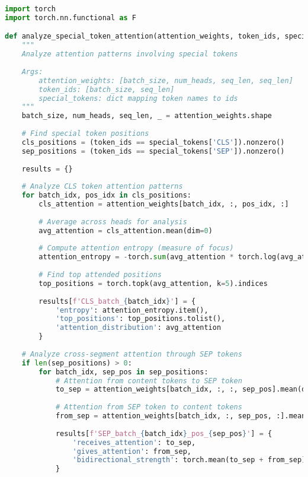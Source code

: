 \begin{lstlisting}[language=Python, caption=Attention pattern analysis with special tokens]
import torch
import torch.nn.functional as F

def analyze_special_token_attention(attention_weights, token_ids, special_tokens):
    """
    Analyze attention patterns involving special tokens
    
    Args:
        attention_weights: [batch_size, num_heads, seq_len, seq_len]
        token_ids: [batch_size, seq_len] 
        special_tokens: dict mapping token names to ids
    """
    batch_size, num_heads, seq_len, _ = attention_weights.shape
    
    # Find special token positions
    cls_positions = (token_ids == special_tokens['CLS']).nonzero()
    sep_positions = (token_ids == special_tokens['SEP']).nonzero()
    
    results = {}
    
    # Analyze CLS token attention patterns
    for batch_idx, pos_idx in cls_positions:
        cls_attention = attention_weights[batch_idx, :, pos_idx, :]
        
        # Average across heads for analysis
        avg_attention = cls_attention.mean(dim=0)
        
        # Compute attention entropy (measure of focus)
        attention_entropy = -torch.sum(avg_attention * torch.log(avg_attention + 1e-10))
        
        # Find top attended positions
        top_positions = torch.topk(avg_attention, k=5).indices
        
        results[f'CLS_batch_{batch_idx}'] = {
            'entropy': attention_entropy.item(),
            'top_positions': top_positions.tolist(),
            'attention_distribution': avg_attention
        }
    
    # Analyze cross-segment attention through SEP tokens
    if len(sep_positions) > 0:
        for batch_idx, sep_pos in sep_positions:
            # Attention from content tokens to SEP token
            to_sep = attention_weights[batch_idx, :, :, sep_pos].mean(dim=0)
            
            # Attention from SEP token to content tokens  
            from_sep = attention_weights[batch_idx, :, sep_pos, :].mean(dim=0)
            
            results[f'SEP_batch_{batch_idx}_pos_{sep_pos}'] = {
                'receives_attention': to_sep,
                'gives_attention': from_sep,
                'bidirectional_strength': torch.mean(to_sep + from_sep)
            }
    

\end{lstlisting}
